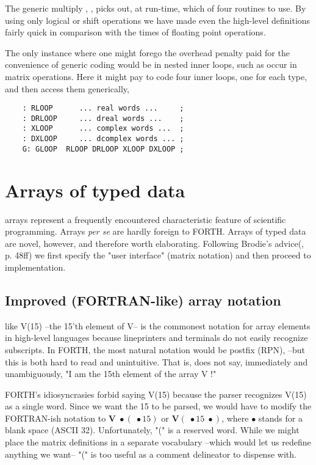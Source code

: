 The generic multiply , \eg, picks out, at run-time, which of four routines to use. By using only logical or shift operations we have made even the high-level definitions fairly quick in comparison with the times of floating point operations.

The only instance where one might forego the overhead penalty paid for the convenience of generic coding would be in nested inner loops, such as occur in matrix operations. Here it might pay to code four inner loops, one for each type, and then access them generically, \eg

\begin{lstlisting}
    : RLOOP      ... real words ...     ;
    : DRLOOP     ... dreal words ...    ;
    : XLOOP      ... complex words ...  ;
    : DXLOOP     ... dcomplex words ... ;
    G: GLOOP  RLOOP DRLOOP XLOOP DXLOOP ;
\end{lstlisting}

\section{Arrays of typed data}

 arrays represent a frequently encountered characteristic feature of scientific programming. Arrays \textit{per se} are hardly foreign to FORTH. Arrays of typed data are novel, however, and therefore worth elaborating. Following Brodie's advice(\TF, p. 48ff) we first specify the "user interface" (matrix notation) and then proceed to implementation.

\subsection{Improved (FORTRAN-like) array notation}
 like V(15) --the 15'th element of V-- is the commonest notation for array elements in high-level languages because lineprinters and terminals do not easily recognize subscripts. In FORTH, the most natural notation would be postfix (RPN),  --but this is both hard to read and unintuitive. That is,  does not say, immediately and unambiguously, "I am the 15th element of the array V !"

FORTH's idiosyncrasies forbid saying V(15) because the parser recognizes V(15) as a single word. Since we want the 15 to be parsed, we would have to modify the FORTRAN-ish notation to $\mathbf V\;\bullet(\;\bullet15)$ or $\mathbf V(\;\bullet15\;\bullet)$, where $\mathbf\bullet$ stands for a blank space (ASCII 32). Unfortunately, "(" is a reserved word. While we might place the matrix definitions in a separate vocabulary --which would let us redefine anything we want-- "(" is too useful as a comment delineator to dispense with.

